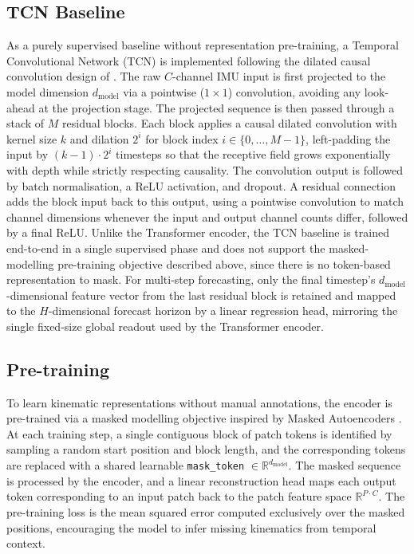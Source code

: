\subsection{TCN Baseline}
As a purely supervised baseline without representation pre-training, a Temporal
Convolutional Network (TCN) is implemented following the dilated causal convolution
design of \cite{PLACEHOLDER}. The raw $C$-channel IMU input is first projected to the
model dimension $d_{\text{model}}$ via a pointwise ($1{\times}1$) convolution, avoiding
any look-ahead at the projection stage.
The projected sequence is then passed through a stack of $M$ residual blocks. Each
block applies a causal dilated convolution with kernel size $k$ and dilation
$2^{i}$ for block index $i \in \{0, \dots, M-1\}$, left-padding the input by
$(k-1)\cdot 2^{i}$ timesteps so that the receptive field grows exponentially with
depth while strictly respecting causality. The convolution output is followed by
batch normalisation, a ReLU activation, and dropout. A residual connection adds the
block input back to this output, using a pointwise convolution to match channel
dimensions whenever the input and output channel counts differ, followed by a final
ReLU.
Unlike the Transformer encoder, the TCN baseline is trained end-to-end in a single
supervised phase and does not support the masked-modelling pre-training objective
described above, since there is no token-based representation to mask. For
multi-step forecasting, only the final timestep's $d_{\text{model}}$-dimensional
feature vector from the last residual block is retained and mapped to the
$H$-dimensional forecast horizon by a linear regression head, mirroring the
single fixed-size global readout used by the Transformer encoder.

\subsection{Pre-training}\label{sec:method-pretrain}

To learn kinematic representations without manual annotations, the encoder is
pre-trained via a masked modelling objective inspired by Masked Autoencoders
\cite{he2022mae}.  At each training step, a single contiguous block of patch tokens is
identified by sampling a random start position and block length, and the corresponding
tokens are replaced with a shared learnable \texttt{mask\_token} $\in
\mathbb{R}^{d_{\text{model}}}$.  The masked sequence is processed by the encoder, and
a linear reconstruction head maps each output token corresponding to an input patch back
to the patch feature space $\mathbb{R}^{P \cdot C}$.  The pre-training loss is the mean squared error
computed exclusively over the masked positions, encouraging the model to infer missing
kinematics from temporal context.


